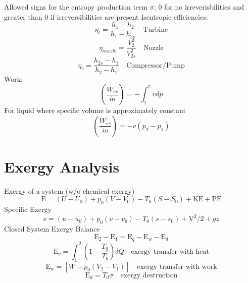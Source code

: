 \documentclass[paper=letter, fontsize=11pt]{scrartcl}
\numberwithin{equation}{section}        %
\numberwithin{figure}{section}          %
\numberwithin{table}{section}               %
\begin{document}
\newline
\newline
Allowed signs for the entropy production term $\sigma$: 0 for no irreverisbilities and greater than 0 if irreversibilities are present
\newline
\newline
Isentropic efficiencies:
\begin{equation}
    \eta_t = \frac{h_1 - h_2}{h_1 - h_{2s}}\quad\text{Turbine}
\end{equation}
\begin{equation}
    \eta_{nozzle} = \frac{V_2^2}{V_{2s}^2}\quad\text{Nozzle}
\end{equation}
\begin{equation}
    \eta_c = \frac{h_{2s} - h_1}{h_2 - h_1}\quad\text{Compressor/Pump}
\end{equation}
\newline
\newline
Work:
\begin{equation}
    \left(\frac{\dot W_{cv}}{\dot m}\right) = -\int_1^2 vdp
\end{equation}
\newline
\newline
For liquid where specific volume is approximately constant
\begin{equation}
    \left(\frac{\dot W_{cv}}{\dot m}\right) = -v(p_2-p_1)
\end{equation}


\newpage
\section{Exergy Analysis}

Exergy of a system (w/o chemical exergy)
\begin{equation}
    \text{E} = (U-U_0) + p_0(V-V_0) - T_0(S-S_0) + \text{KE} + \text{PE}
\end{equation}
\newline
\newline
Specific Exergy
\begin{equation}
    \text{e} = (u-u_0) + p_0(v-v_0) - T_0(s-s_0) + \text{V}^2/2 + gz
\end{equation}
\newline
\newline
Closed System Exergy Balance
\begin{equation}
    \text{E}_2 - \text{E}_1 = \text{E}_q - \text{E}_w - \text{E}_d
\end{equation}
\begin{equation}
    \text{E}_q = \int_1^2\left(1 - \frac{T_0}{T_b}\right)\delta Q\quad\text{exergy transfer with heat}
\end{equation}
\begin{equation}
    \text{E}_w = [W - p_0(V_2-V_1)]\quad\text{exergy transfer with work}
\end{equation}
\begin{equation}
    \text{E}_d = T_0\sigma\quad\text{exergy destruction}
\end{equation}
\end{document}
